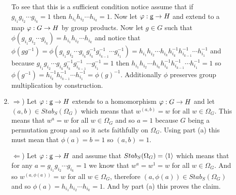 \documentclass[12pt]{amsart}
\begin{document}
\begin{itemize}
\begin{enumerate}[label= (\alph*)]
      To see that this is a sufficient condition notice assume that if 
      $g_{i_1}g_{i_2}\cdots g_{i_k}=1$ then $h_{i_1}h_{i_2}\cdots h_{i_k}=1$. Now let $\varphi:\underbar{g}\rightarrow H$
      and extend to a map $\varphi: G\rightarrow H$ by group products. Now let $g\in G$ such that 
      $\phi(g_{i_1}g_{i_2}\cdots g_{i_k})=h_{i_1}h_{i_2}\cdots h_{i_k}$ and notice 
      that $\phi(gg^{-1})=\phi(g_{i_1}g_{i_2}\cdots g_{i_k}g^{-1}_{i_{k}}g^{-1}_{i_{k-1}}\cdots g^{-1}_{i_1})=h_{i_1}h_{i_2}\cdots h_{i_k}h^{-1}_{i_{k}}h^{-1}_{i_{k-1}}\cdots h^{-1}_{i_1}$
      and because $g_{i_1}g_{i_2}\cdots g_{i_k}g^{-1}_{i_{k}}g^{-1}_{i_{k-1}}\cdots g^{-1}_{i_1}=1$
      then $h_{i_1}h_{i_2}\cdots h_{i_k}h^{-1}_{i_{k}}h^{-1}_{i_{k-1}}\cdots h^{-1}_{i_1}=1$ so $\phi(g^{-1})=h^{-1}_{i_{k}}h^{-1}_{i_{k-1}}\cdots h^{-1}_{i_1}=\phi(g)^{-1}$.
      Additionally $\phi$ preserves group multiplication by construction.
      
      \item $\Rightarrow$) Let $\varphi:\underbar{g}\rightarrow H$ extends to a homomorphism $\varphi:G\rightarrow H$
            and let $(a,b)\in Stab_S(\Omega_G)$ which means that $w^{(a,b)}=w$ for all $w\in\Omega_G$.
            This means that $w^a=w$ for all $w\in\Omega_G$ and so $a=1$ because $G$ being a permutation group and so it acts faithfully on $\Omega_G$.%
             Using part (a) this must mean
            that $\phi(a)=b=1$ so $(a,b)=1$.

            $\Leftarrow$) Let $\varphi:\underbar{g}\rightarrow H$ and assume that $Stab_S(\Omega_G)=\left\langle 1 \right\rangle$ 
            which means that for any $a=g_{i_1}g_{i_2}\cdots g_{i_k}=1$ we know that $w^a=w^1=w$ for all 
            $w\in\Omega_G$. And so $w^{(a,\phi(a))}=w$ for all $w\in \Omega_G$, therefore 
            $(a,\phi(a))\in Stab_S(\Omega_G)$ and so $\phi(a)=h_{i_1}h_{i_2}\cdots h_{i_k}=1$. And by part (a) this proves the claim.
   \end{enumerate}
\end{itemize}
\end{document}
